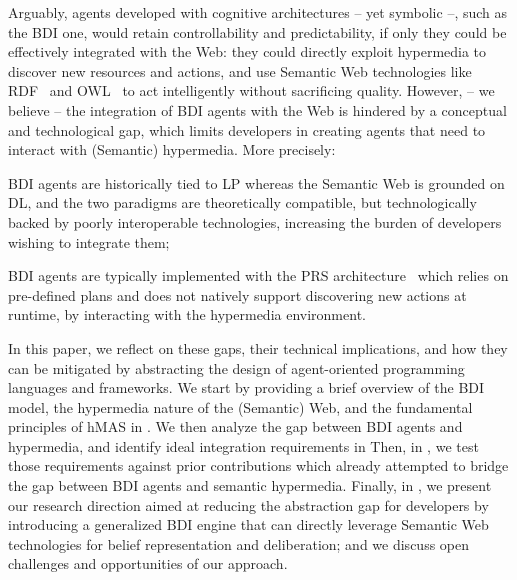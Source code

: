 \documentclass[
]{ceurart}
\begin{document}
Arguably,
agents developed with cognitive architectures 
-- yet symbolic --,
such as the \ac{BDI} one,
would retain controllability and predictability,
if only they could be effectively integrated with the Web:
they could directly exploit hypermedia to discover new resources and actions, 
and use Semantic Web technologies like \ac{RDF}~\cite{RDF_Concepts_W3C:14} and \ac{OWL}~\cite{OWL_Syntax_W3C:12} 
to act intelligently without sacrificing quality.
%
However,
-- we believe --
the integration of \ac{BDI} agents with the Web
is hindered by a conceptual and technological gap, 
which limits developers in creating agents that need to interact with (Semantic) hypermedia.
%
More precisely:
\begin{enumerate*}[label=\textbf{(G\arabic*)}]
  \item\label{gap:logic}
  \ac{BDI} agents are historically tied to \ac{LP}
  whereas the Semantic Web is grounded on \ac{DL},
  and the two paradigms are theoretically compatible, 
  but technologically backed by poorly interoperable technologies,
  increasing the burden of developers wishing to integrate them;
  
  \item\label{gap:open-world}
  \ac{BDI} agents are typically implemented with the \ac{PRS} architecture~\cite{georgeff1986pieee} 
  which relies on pre-defined plans and does not natively support discovering new actions at runtime,
  by interacting with the hypermedia environment.
\end{enumerate*}

In this paper, 
we reflect on these gaps,
their technical implications, %
and
how they can be mitigated by abstracting the design of agent-oriented programming languages and frameworks. 
%
We start by providing a brief overview of the \ac{BDI} model, 
the hypermedia nature of the (Semantic) Web,
and 
the fundamental principles of \ac{hMAS} in .
%
We then analyze the gap between \ac{BDI} agents and hypermedia, 
and identify ideal integration requirements in 
%
Then, 
in ,
we test those requirements against prior contributions 
which already attempted to bridge the gap between \ac{BDI} agents and semantic hypermedia.
%
Finally, 
in ,
we present our research direction
aimed at %
reducing the abstraction gap for developers
by introducing a generalized \ac{BDI} engine
that can directly leverage Semantic Web technologies for belief representation and deliberation;
and we discuss open challenges and opportunities of our approach.
\end{document}
